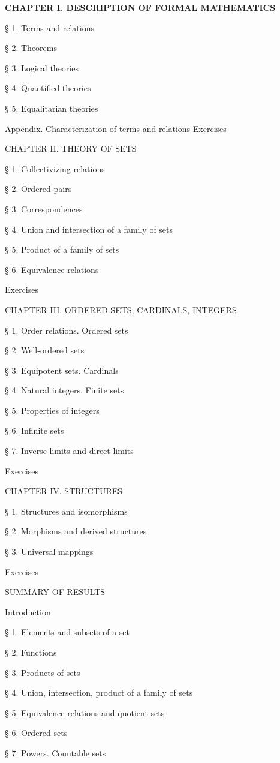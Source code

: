 \textbf{CHAPTER I. DESCRIPTION OF FORMAL MATHEMATICS}

§ 1. Terms and relations

§ 2. Theorems

§ 3. Logical theories

§ 4. Quantified theories

§ 5. Equalitarian theories

Appendix. Characterization of terms and relations Exercises

CHAPTER II. THEORY OF SETS

§ 1. Collectivizing relations

§ 2. Ordered pairs

§ 3. Correspondences

§ 4. Union and intersection of a family of sets

§ 5. Product of a family of sets

§ 6. Equivalence relations

Exercises

CHAPTER III. ORDERED SETS, CARDINALS, INTEGERS

§ 1. Order relations. Ordered sets

§ 2. Well-ordered sets

§ 3. Equipotent sets. Cardinals

§ 4. Natural integers. Finite sets

§ 5. Properties of integers

§ 6. Infinite sets

§ 7. Inverse limits and direct limits

Exercises

CHAPTER IV. STRUCTURES

§ 1. Structures and isomorphisms

§ 2. Morphisms and derived structures

§ 3. Universal mappings

Exercises

SUMMARY OF RESULTS

Introduction

§ 1. Elements and subsets of a set

§ 2. Functions

§ 3. Products of sets

§ 4. Union, intersection, product of a family of sets

§ 5. Equivalence relations and quotient sets

§ 6. Ordered sets

§ 7. Powers. Countable sets

